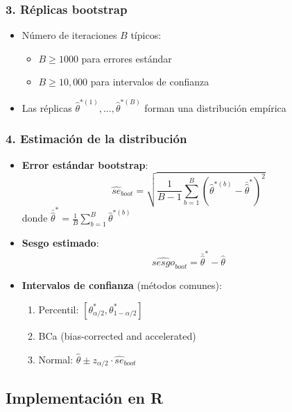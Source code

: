 \documentclass[
  spanish,
  11pt,
]{article}
\providecommand{\tightlist}{%
  \setlength{\itemsep}{0pt}\setlength{\parskip}{0pt}}
\begin{document}
\subsubsection{3. Réplicas bootstrap}\label{ruxe9plicas-bootstrap}

\begin{itemize}
\tightlist
\item
  Número de iteraciones \(B\) típicos:

  \begin{itemize}
  \tightlist
  \item
    \(B \geq 1000\) para errores estándar
  \item
    \(B \geq 10,000\) para intervalos de confianza
  \end{itemize}
\item
  Las réplicas \(\hat{\theta}^{*(1)}, \dots, \hat{\theta}^{*(B)}\)
  forman una distribución empírica
\end{itemize}

\subsubsection{4. Estimación de la
distribución}\label{estimaciuxf3n-de-la-distribuciuxf3n}

\begin{itemize}
\item
  \textbf{Error estándar bootstrap}:
  \[\widehat{se}_{boot} = \sqrt{\frac{1}{B-1} \sum_{b=1}^B \left( \hat{\theta}^{*(b)} - \bar{\hat{\theta}}^{*} \right)^2}\]
  donde
  \(\bar{\hat{\theta}}^{*} = \frac{1}{B}\sum_{b=1}^B \hat{\theta}^{*(b)}\)
\item
  \textbf{Sesgo estimado}:
  \[\widehat{sesgo}_{boot} = \bar{\hat{\theta}}^{*} - \hat{\theta}\]
\item
  \textbf{Intervalos de confianza} (métodos comunes):

  \begin{enumerate}
  \def\labelenumi{\arabic{enumi}.}
  \tightlist
  \item
    Percentil: \([\theta_{\alpha/2}^{*}, \theta_{1-\alpha/2}^{*}]\)
  \item
    BCa (bias-corrected and accelerated)
  \item
    Normal: \(\hat{\theta} \pm z_{\alpha/2} \cdot \widehat{se}_{boot}\)
  \end{enumerate}
\end{itemize}

\subsection{Implementación en R}\label{implementaciuxf3n-en-r}
\end{document}
